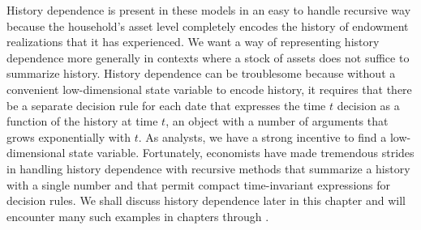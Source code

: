 History dependence is present in these models in an easy to handle
recursive way because the household's asset level completely
encodes the history of endowment realizations that it has
experienced.  We want a way of representing history dependence
more generally in contexts where a stock of assets does not
suffice to summarize history. History dependence can be
troublesome because without a convenient low-dimensional state
variable to encode history, it  requires that there be a separate
decision rule for each date that expresses the time $t$ decision
as a function of the history at time $t$, an object with a number
of arguments that grows exponentially with $t$. As analysts, we have a strong
incentive to find a low-dimensional state variable. Fortunately, economists have
made tremendous strides in handling history dependence with
recursive methods that summarize a history with
a single number and that permit compact time-invariant expressions for
decision rules. We shall discuss history dependence later in this
chapter and will encounter many such examples in chapters
 through .



